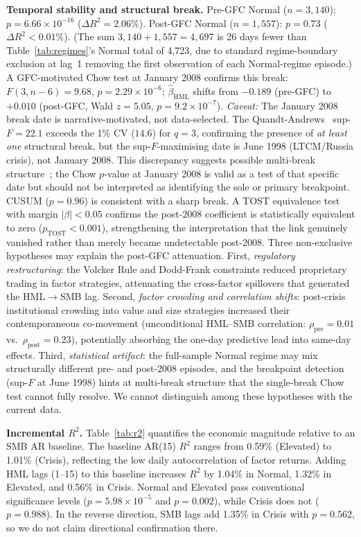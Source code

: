 \documentclass[sigconf,anonymous]{acmart}
\begin{document}
\textbf{Temporal stability and structural break.}
Pre-GFC Normal ($n = 3{,}140$): $p = 6.66\times10^{-16}$ ($\Delta R^2 = 2.06\%$).
Post-GFC Normal ($n = 1{,}557$): $p = 0.73$ ($\Delta R^2 < 0.01\%$).
(The sum $3{,}140 + 1{,}557 = 4{,}697$ is 26 days fewer than Table~\ref{tab:regimes}'s
Normal total of 4{,}723, due to standard regime-boundary exclusion at lag~1
removing the first observation of each Normal-regime episode.)
A GFC-motivated Chow test at January 2008 confirms this break: $F(3,n{-}6) = 9.68$,
$p = 2.29\times10^{-6}$; $\hat{\beta}_{\text{HML}}$ shifts from $-0.189$
(pre-GFC) to $+0.010$ (post-GFC, Wald $z = 5.05$, $p = 9.2\times10^{-7}$).
\emph{Caveat:} The January 2008 break date is narrative-motivated, not data-selected.
The Quandt-Andrews~\cite{andrews1993tests} sup-$F = 22.1$ exceeds the 1\% CV
($14.6$) for $q=3$, confirming the presence of \emph{at least one} structural break,
but the sup-$F$-maximising date is June 1998 (LTCM/Russia crisis), not January 2008.
This discrepancy suggests possible multi-break structure~\cite{bai1998estimating};
the Chow $p$-value at January 2008 is valid as a test of that specific date
but should not be interpreted as identifying the sole or primary breakpoint.
CUSUM ($p = 0.96$) is consistent with a sharp break.
A TOST equivalence test~\cite{schuirmann1987comparison} with margin $|\beta| < 0.05$
confirms the post-2008 coefficient is statistically equivalent to zero ($p_{\text{TOST}} < 0.001$),
strengthening the interpretation that the link genuinely vanished rather than merely
became undetectable post-2008.
Three non-exclusive hypotheses may explain the post-GFC attenuation.
First, \emph{regulatory restructuring}: the Volcker Rule and Dodd-Frank
constraints reduced proprietary trading in factor strategies, attenuating
the cross-factor spillovers that generated the HML$\to$SMB lag.
Second, \emph{factor crowding and correlation shifts}: post-crisis
institutional crowding into value and size strategies increased their
contemporaneous co-movement (unconditional HML--SMB correlation:
$\rho_{\text{pre}} = 0.01$ vs.\ $\rho_{\text{post}} = 0.23$),
potentially absorbing the one-day predictive lead into same-day effects.
Third, \emph{statistical artifact}: the full-sample Normal regime may
mix structurally different pre- and post-2008 episodes, and the
breakpoint detection (sup-$F$ at June 1998) hints at multi-break
structure that the single-break Chow test cannot fully resolve.
We cannot distinguish among these hypotheses with the current data.

\textbf{Incremental $R^2$.} Table~\ref{tab:r2} quantifies the economic magnitude
relative to an SMB AR baseline. The baseline AR(15) $R^2$ ranges from 0.59\%
(Elevated) to 1.01\% (Crisis), reflecting the low daily autocorrelation of
factor returns. Adding HML lags (1--15) to this baseline increases $R^2$ by
1.04\% in Normal, 1.32\% in Elevated, and 0.56\% in Crisis. Normal and Elevated pass conventional
significance levels ($p = 5.98 \times 10^{-5}$ and $p = 0.002$), while Crisis
does not ($p = 0.988$). In the reverse direction, SMB lags add 1.35\% in Crisis
with $p = 0.562$, so we do not claim directional confirmation there.
\end{document}

